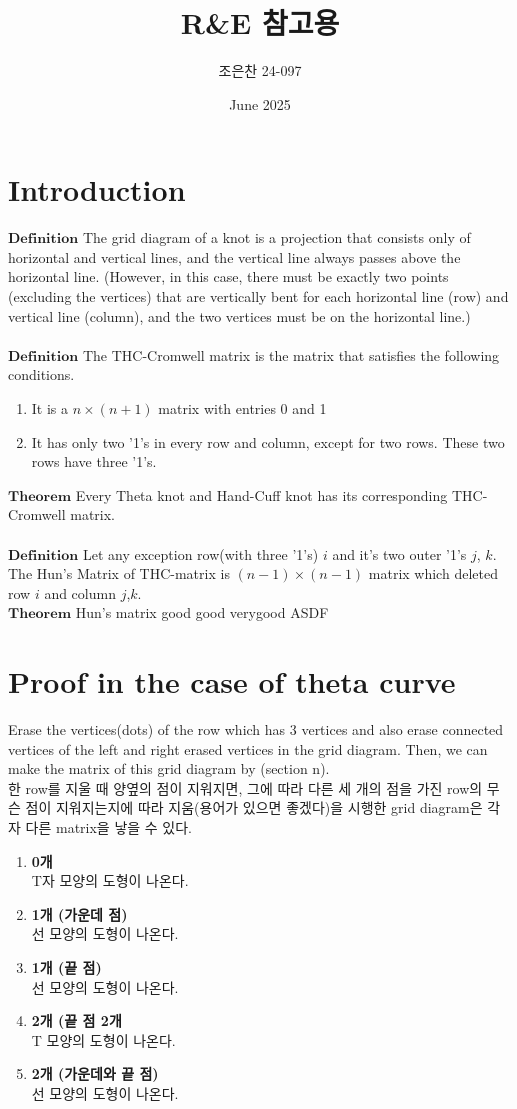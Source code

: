 \documentclass{article}
\title{R\&E 참고용}
\author{조은찬 24-097}
\date{June 2025}
\begin{document}
\maketitle

\section{Introduction}
$\mathbf{Definition}$ The grid diagram of a knot is a projection that consists only of horizontal and vertical lines, and the vertical line always passes above the horizontal line. (However, in this case, there must be exactly two points (excluding the vertices) that are vertically bent for each horizontal line (row) and vertical line (column), and the two vertices must be on the horizontal line.) \\ \\
$\mathbf{Definition}$ The THC-Cromwell matrix is the matrix that satisfies the following conditions.
\begin{enumerate}
    \item It is a $n\times(n+1)$ matrix with entries 0 and 1
    \item It has only two '1's in every row and column, except for two rows. These two rows have three '1's.
\end{enumerate}
$\mathbf{Theorem}$ Every Theta knot and Hand-Cuff knot has its corresponding THC-Cromwell matrix. \\ \\
$\mathbf{Definition}$ Let any exception row(with three '1's) $i$ and it's two outer '1's $j$, $k$. The Hun's Matrix of THC-matrix is $(n-1)\times(n-1)$ matrix which deleted row $i$ and column $j$,$k$.\\
$\mathbf{Theorem}$ 
Hun's matrix good good verygood
ASDF

\section{Proof in the case of theta curve}
Erase the vertices(dots) of the row which has 3 vertices and also erase connected vertices of the left and right erased vertices in the grid diagram. Then, we can make the matrix of this grid diagram by (section n).\\
한 row를 지울 때 양옆의 점이 지워지면, 그에 따라 다른 세 개의 점을 가진 row의 무슨 점이 지워지는지에 따라 지움(용어가 있으면 좋겠다)을 시행한 grid diagram은 각자 다른 matrix을 낳을 수 있다.
\begin{enumerate}
    \item \textbf{0개}\\
    T자 모양의 도형이 나온다.
    \item \textbf{1개 (가운데 점)}\\
    선 모양의 도형이 나온다.
    \item \textbf{1개 (끝 점)}\\
    선 모양의 도형이 나온다.
    \item \textbf{2개 (끝 점 2개}\\
    T 모양의 도형이 나온다.
    \item \textbf{2개 (가운데와 끝 점)}\\
    선 모양의 도형이 나온다.
\end{enumerate}
\end{document}
